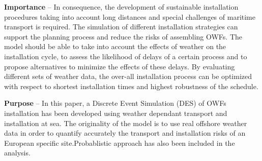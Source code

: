 \textbf{Importance} --
In consequence, the development of sustainable installation procedures taking into account long distances and special challenges of maritime transport is required. The simulation of different installation strategies can support the planning process and reduce the risks of assembling OWFs. The model should be able to take into account the effects of weather on the installation cycle, to assess the likelihood of delays of a certain process and to propose alternatives to minimize the effects of these delays. By evaluating different sets of weather data, the over-all installation process can be optimized with respect to shortest installation times and highest robustness of the schedule.

\textbf{Purpose} --
In this paper, a Discrete Event Simulation (DES) of OWFs installation has been developed using weather dependant transport and installation at sea. The originality of the model is to use real offshore weather data in order to quantify accurately the transport and installation risks of an European specific site.Probablistic approach has also been included in the analysis.


